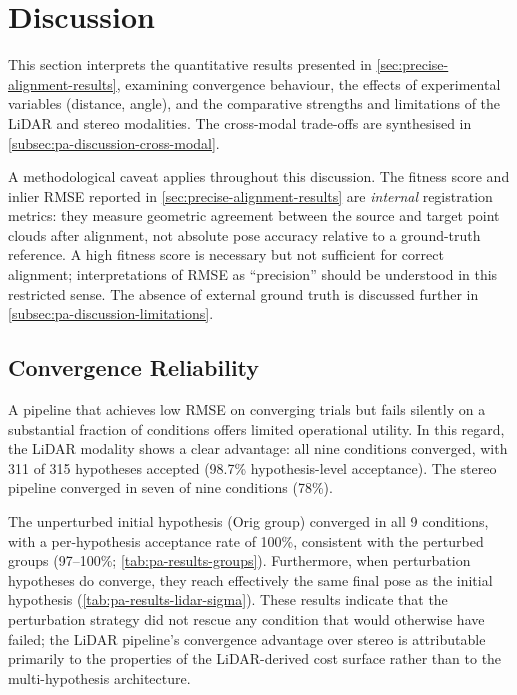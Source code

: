 \section{Discussion}
\label{sec:precise-alignment-discussion}

This section interprets the quantitative results presented in \cref{sec:precise-alignment-results}, examining convergence behaviour, the effects of experimental variables (distance, angle), and the comparative strengths and limitations of the LiDAR and stereo modalities. The cross-modal trade-offs are synthesised in \cref{subsec:pa-discussion-cross-modal}.

A methodological caveat applies throughout this discussion. The fitness score and inlier RMSE reported in \cref{sec:precise-alignment-results} are \emph{internal} registration metrics: they measure geometric agreement between the source and target point clouds after alignment, not absolute pose accuracy relative to a ground-truth reference. A high fitness score is necessary but not sufficient for correct alignment; interpretations of RMSE as ``precision'' should be understood in this restricted sense. The absence of external ground truth is discussed further in \cref{subsec:pa-discussion-limitations}.

\subsection{Convergence Reliability}
\label{subsec:pa-discussion-convergence}

A pipeline that achieves low RMSE on converging trials but fails silently on a substantial fraction of conditions offers limited operational utility. In this regard, the LiDAR modality shows a clear advantage: all nine conditions converged, with 311 of 315 hypotheses accepted (98.7\% hypothesis-level acceptance). The stereo pipeline converged in seven of nine conditions (78\%).

The unperturbed initial hypothesis (Orig group) converged in all 9 conditions, with a per-hypothesis acceptance rate of 100\%, consistent with the perturbed groups (97--100\%; \cref{tab:pa-results-groups}). Furthermore, when perturbation hypotheses do converge, they reach effectively the same final pose as the initial hypothesis (\cref{tab:pa-results-lidar-sigma}). These results indicate that the perturbation strategy did not rescue any condition that would otherwise have failed; the LiDAR pipeline's convergence advantage over stereo is attributable primarily to the properties of the LiDAR-derived cost surface rather than to the multi-hypothesis architecture.

